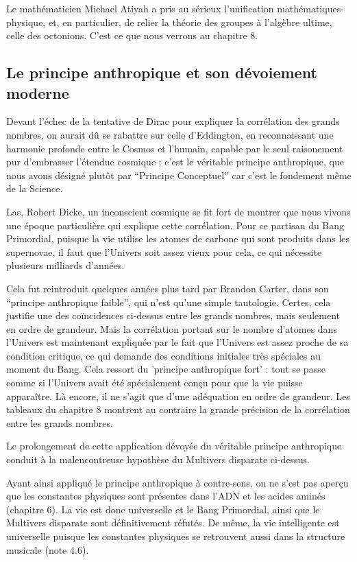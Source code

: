 \documentclass[a4paper,12pt]{article}
\begin{document}
Le mathématicien Michael Atiyah a pris au sérieux l'unification mathématiques-physique, et, en particulier, de relier la théorie des groupes à l'algèbre ultime, celle des octonions. C'est ce que nous verrons au chapitre 8. 


\subsection{Le principe anthropique et son dévoiement moderne}
 
Devant l'échec de la tentative de Dirac pour expliquer la corrélation des grands nombres, on aurait dû se rabattre sur celle d'Eddington, en reconnaissant une harmonie profonde entre le Cosmos et l'humain, capable par le seul raisonement pur d'embrasser l'étendue cosmique : c'est le véritable principe anthropique, que nous avons désigné plutôt par ``Principe Conceptuel'' car c'est le fondement m\^eme de la Science. 


Las, Robert Dicke, un inconscient cosmique  se fit fort de montrer que nous vivons une époque particulière qui explique cette corrélation. Pour ce partisan du Bang Primordial, puisque la vie utilise les atomes de carbone qui sont produits dans les supernovae, il faut que l'Univers soit assez vieux pour cela, ce qui nécessite plusieurs milliards d'années.

Cela fut reintroduit quelques années plus tard par Brandon Carter, dans son ``principe anthropique faible'', qui n'est qu'une simple tautologie. Certes, cela justifie une des coïncidences ci-dessus entre les grands nombres, mais seulement en ordre de grandeur. Mais la corrélation portant sur le nombre d'atomes dans l'Univers est maintenant expliquée par le fait que l'Univers est assez proche de sa condition critique, ce qui demande des conditions initiales très spéciales au moment du Bang. Cela ressort du 'principe anthropique fort' : tout se passe comme si l'Univers avait été spécialement conçu pour que la vie puisse apparaître. Là encore, il ne s'agit que d'une adéquation en ordre de grandeur. Les tableaux du chapitre 8 montrent au contraire la grande précision de la corrélation entre les grands nombres.

Le prolongement de cette application dévoyée du véritable principe anthropique conduit à la malencontreuse hypothèse du Multivers disparate ci-dessus.
 
Ayant ainsi appliqué le principe anthropique à contre-sens, on ne s'est pas aperçu que les constantes physiques sont présentes dans l'ADN et les acides aminés (chapitre 6).  La vie est donc universelle et le Bang Primordial, ainsi que le Multivers disparate sont définitivement réfutés. De même, la vie intelligente est universelle puisque les constantes physiques se retrouvent aussi dans la structure musicale (note 4.6).
\end{document}
